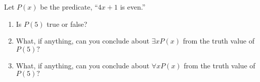 \documentclass[11pt,]{book}
\theoremstyle{ptxplainnotitle}
\theoremstyle{ptxplaintitle}
\theoremstyle{ptxdefinitionnotitle}
\theoremstyle{ptxdefinitiontitle}
\theoremstyle{ptxdefinitionnotitle}
\theoremstyle{ptxdefinitiontitle}
\theoremstyle{ptxdefinitionnotitle}
\theoremstyle{ptxdefinitiontitle}
\theoremstyle{ptxdefinitiontitlenonumber}
\theoremstyle{ptxdefinitiontitlenonumber}
\numberwithin{equation}{chapter}
\begin{document}
\begin{divisionexercise}{8}\hypertarget{exercise-156}{}
\hypertarget{p-2181}{}%
Let \(P(x)\) be the predicate, ``\(4x+1\) is even.'' \leavevmode%
\begin{enumerate}[label=\alph*.]
\item\hypertarget{li-1070}{}\hypertarget{p-2182}{}%
Is \(P(5)\) true or false? %
\item\hypertarget{li-1075}{}\hypertarget{p-2187}{}%
What, if anything, can you conclude about \(\exists x P(x)\) from the truth value of \(P(5)\text{?}\)%
\item\hypertarget{li-1076}{}\hypertarget{p-2188}{}%
What, if anything, can you conclude about \(\forall x P(x)\) from the truth value of \(P(5)\text{?}\)%
\end{enumerate}
%
\end{divisionexercise}%
\end{document}
